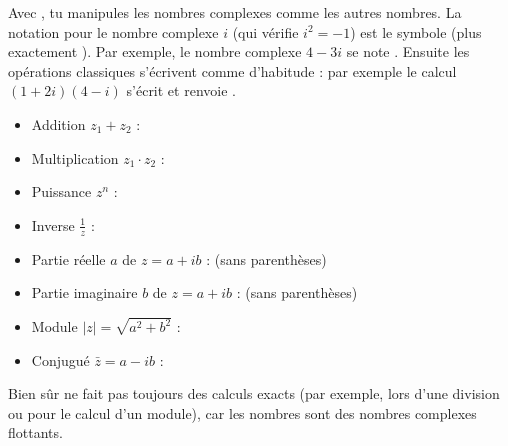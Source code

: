 \documentclass[11pt,class=report,crop=false]{standalone}
\begin{document}




\begin{cours}

Avec \Python, tu manipules les nombres complexes comme les autres nombres.
La notation pour le nombre complexe $i$ (qui vérifie $i^2=-1$) est le symbole  (plus exactement ).
Par exemple, le nombre complexe $4-3i$ se note . 
Ensuite les opérations classiques s'écrivent comme d'habitude : par exemple le calcul $(1+2i)(4-i)$ s'écrit  et \Python{} renvoie .

\begin{itemize}
  \item Addition $z_1+z_2$ : 
  \item Multiplication $z_1 \cdot z_2$ : 
  \item Puissance $z^n$ : 
  \item Inverse $\frac{1}{z}$ : 
  \item Partie réelle $a$ de $z=a+ib$ :  \quad (sans parenthèses)
  \item Partie imaginaire $b$ de $z=a+ib$ :  \quad (sans parenthèses) 
  \item Module $|z| = \sqrt{a^2+b^2}$ : 
  \item Conjugué $\bar z = a-ib$ : 
\end{itemize}

\bigskip

Bien sûr \Python{} ne fait pas toujours des calculs exacts (par exemple, lors d'une division ou pour le calcul d'un module), car les nombres sont des nombres complexes flottants.
\end{cours}


\end{document}
